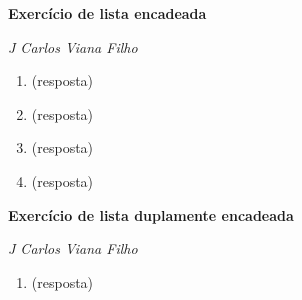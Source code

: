 \documentclass[a4paper,11pt]{article}
\begin{document}
\begin{flushright}
\makeatletter
\textit{\@date}
\makeatother
\end{flushright}

\begin{center}
{\Large \textbf{Exercício de lista encadeada}}
\end{center}

\textit{J Carlos Viana Filho}


\begin{enumerate}
\item (resposta)


\item (resposta)


\item (resposta)


\item (resposta)


\end{enumerate}

\newpage

\begin{flushright}
\makeatletter
\textit{\@date}
\makeatother
\end{flushright}

\begin{center}
{\Large \textbf{Exercício de lista duplamente encadeada}}
\end{center}

\textit{J Carlos Viana Filho}

\begin{enumerate}

\item (resposta)


\end{enumerate}
\end{document}
